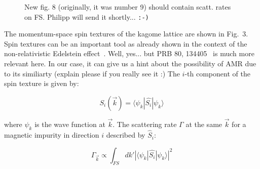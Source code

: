 \documentclass[prb,showpacs,amsmath,amssymb,superscriptaddress,twocolumn,floatfix]{revtex4-1}
\begin{document}

\begin{figure}
\caption{New fig. 8 (originally, it was number 9) should contain scatt. rates on FS. Philipp will send it shortly... {\tt :-)}}
\label{fig-09}
\end{figure}

The momentum-space spin textures of the kagome lattice %
are shown in Fig.~3.  %
Spin textures can be an important tool as already shown in the context of the non-relativistic Edelstein effect~\cite{Gonzalez-Hernandez:2024}.
{\color{red}Well, yes... but PRB 80, 134405~\cite{Trushin:2009_a} is much more relevant here.} In our case, it can give us a hint about the possibility of AMR due to its similiarty
{\color{red}(explain please if you really see it :)} The $i$-th component of the spin texture is given by:

\begin{equation}
	S_i (\vec{k}) = \langle \psi_k | \hat{S_i} | \psi_k \rangle
	\label{eq_spintexture}
\end{equation}

where $\psi_k$ is the wave function at $\vec{k}$. The scattering rate $\Gamma$ at the same $\vec{k}$ for a magnetic impurity in direction $i$ described by $\hat{S}_i$:

\begin{equation}	
	{\Gamma_{\vec{k}}} \propto \int_{FS} dk' |\langle \psi_k |\hat{S_i}|\psi_k \rangle|^2
	\label{eq_FermiGoldenRule_2}
\end{equation}
\end{document}
